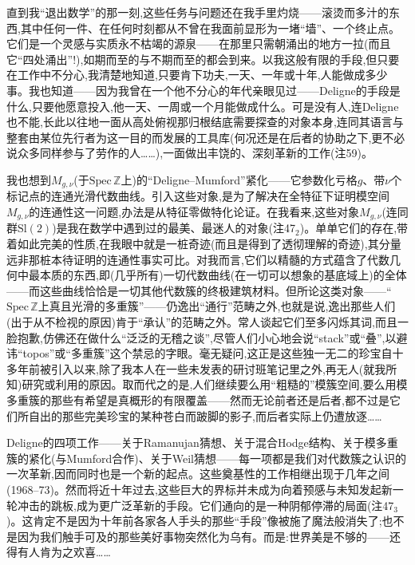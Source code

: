 直到我“退出数学”的那一刻,这些任务与问题还在我手里灼烧——滚烫而多汁的东西,其中任何一件、在任何时刻都从不曾在我面前显形为一堵“墙”、一个终止点。它们是一个灵感与实质\dmark{}永不枯竭的源泉——在那里只需朝涌出的地方一拉(而且它“四处涌出”!),如期而至的与不期而至的都会到来。以我这般有限的手段,但只要在工作中不分心,我清楚地知道,只要肯下功夫,一天、一年或十年,人能做成多少事。我也知道——因为我曾在一个他不分心的年代亲眼见过——Deligne的手段是什么,只要他愿意投入,他一天、一周或一个月能做成什么。可是没有人,连Deligne也不能,长此以往地一面从高处俯视那归根结底需要探查的对象本身,连同其语言与整套由某位先行者为这一目的而发展的工具库(何况还是在后者的协助之下,更不必说众多同样参与了劳作的人……),一面做出丰饶的、深刻革新的工作(注59)。

我也想到$M_{g,\nu}$(于$\mathrm{Spec}\,\mathbb{Z}$上)的“Deligne--Mumford”紧化——它参数化亏格$g$、带$\nu$个标记点的连通光滑代数曲线。引入这些对象,是为了解决在全特征下证明模空间$M_{g,\nu}$的连通性这一问题,办法是从特征零做特化论证。在我看来,这些对象$M_{g,\nu}$(连同群$\mathrm{Sl}(2)$)是我在数学中遇到过的最美、最迷人的对象(注47$_{2}$)。单单它们的存在,带着如此完美的性质,在我眼中就是一桩奇迹(而且是得到了透彻理解的奇迹),其分量远非那桩本待证明的连通性事实可比。对我而言,它们以精髓的方式蕴含了代数几何中最本质的东西,即(几乎所有)一切代数曲线(在一切可以想象的基底域上)的全体——而这些曲线恰恰是一切其他代数簇的终极建筑材料。但所论这类对象——“$\mathrm{Spec}\,\mathbb{Z}$上真且光滑的多重簇”——仍逸出“通行”范畴之外,也就是说,逸出那些人们(出于从不检视的原因)肯于“承认”的范畴之外。常人谈起它们至多闪烁其词,而且一脸抱歉,仿佛还在做什么“泛泛的无稽之谈”,尽管人们小心地会说“stack”或“叠”,以避讳“topos”或“多重簇”这个禁忌的字眼。毫无疑问,这正是这些独一无二的珍宝自十多年前被引入以来,除了我本人在一些未发表的研讨班笔记\dmark{}里之外,再无人(就我所知)研究或利用的原因。取而代之的是,人们继续要么用“粗糙的”模簇空间,要么用模多重簇的那些有希望是真概形的有限覆盖——然而无论前者还是后者,都不过是它们所自出的那些完美珍宝的某种苍白而跛脚的影子,而后者实际上仍遭放逐……

Deligne的四项工作——关于Ramanujan猜想、关于混合Hodge结构、关于模多重簇的紧化(与Mumford合作)、关于Weil猜想——每一项都是我们对代数簇之认识的一次革新,因而同时也是一个新的起点。这些奠基性的工作相继出现于几年之间(1968--73)。然而将近十年过去,这些巨大的界标并未成为向着预感与未知发起新一轮冲击的跳板,成为更广泛革新的手段。它们通向的是一种阴郁停滞的局面(注47$_{3}$)。这肯定不是因为十年前各家各人手头的那些“手段”像被施了魔法般消失了;也不是因为我们触手可及的那些美好事物突然化为乌有。而是:世界美是不够的——还得有人肯为之欢喜……

